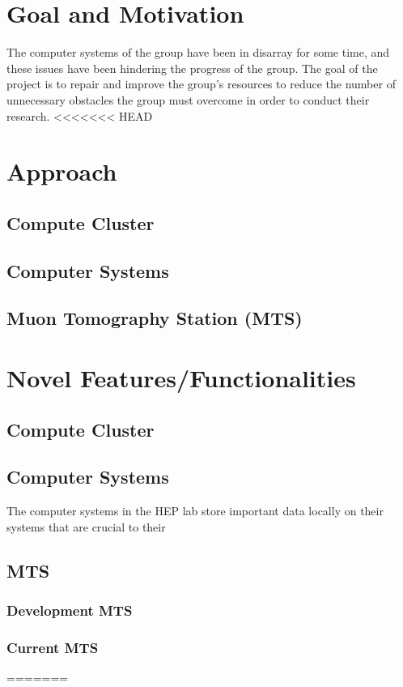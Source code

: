 \documentclass[12pt]{article}
\newcommand\tab[1][1cm]{\hspace*{#1}}
\begin{document}
\section{Goal and Motivation}
\tab The computer systems of the group have been in disarray for
some time, and these issues have been hindering the progress of
the group. The goal of the project is to repair and improve the
group’s resources to reduce the number of unnecessary obstacles
the group must overcome in order to conduct their research.
<<<<<<< HEAD
\section{Approach}
\subsection{Compute Cluster}
\subsection{Computer Systems}
\subsection{Muon Tomography Station (MTS)}

\section{Novel Features/Functionalities}
\subsection{Compute Cluster}
\subsection{Computer Systems}
\tab The computer systems in the HEP lab store important data locally on their systems that are crucial to their 
\subsection{MTS}
\subsubsection{Development MTS}
\subsubsection{Current MTS}
=======
\end{document}
